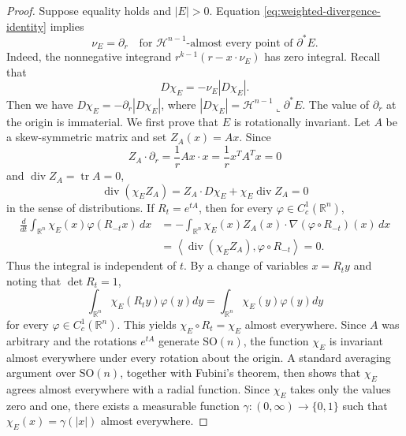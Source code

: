 \documentclass[11pt,reqno]{amsart}
\numberwithin{equation}{section}
\theoremstyle{definition}
\newcommand{\R}{\mathbb R}
\newcommand{\calH}{\mathcal H}
\newcommand{\diver}{\operatorname{div}}
\begin{document}
\begin{proof}
Suppose equality holds and $|E|>0$.  Equation \eqref{eq:weighted-divergence-identity} implies
\begin{equation*}
    \nu_E=\partial_r
    \quad\text{for }\calH^{n-1}\text{-almost every point of }\partial^*E.
\end{equation*}
Indeed, the nonnegative integrand $r^{k-1}(r-x\cdot\nu_E)$ has zero integral. Recall that
\begin{equation*}
    D\chi_E=-\nu_E|D\chi_E|.
\end{equation*}
Then we have $D\chi_E=-\partial_r|D\chi_E|$, where $|D\chi_E|=\mathcal{H}^{n-1}\mathbin{\llcorner}\partial^*E$.  The value of $\partial_r$ at the origin is immaterial. We first prove that $E$ is rotationally invariant. Let $A$ be a skew-symmetric matrix and set $Z_A(x)=Ax$.  Since 
\begin{equation*}
    Z_A\cdot \partial_r=\frac{1}{r}Ax\cdot x=\frac{1}{r}x^TA^Tx=0
\end{equation*}
and $\diver Z_A=\operatorname{tr}A=0$,
\begin{equation*}
    \diver(\chi_E Z_A)
    =Z_A\cdot D\chi_E+\chi_E\diver Z_A=0
\end{equation*}
in the sense of distributions. If $R_t=e^{tA}$, then for every $\varphi\in C_c^1(\R^n)$,
\begin{align*}
\frac{d}{dt}\int_{\mathbb R^n}
 \chi_E(x)\varphi(R_{-t}x)\,dx
&=-\int_{\mathbb R^n}
 \chi_E(x)Z_A(x)\cdot
 \nabla(\varphi\circ R_{-t})(x)\,dx\\
&=\left\langle
 \diver(\chi_EZ_A),\varphi\circ R_{-t}
 \right\rangle=0.
\end{align*}
Thus the integral is independent of $t$. By a change of variables $x=R_ty$ and noting that $\det R_t=1$, 
\begin{equation*}
    \int_{\R^n}\chi_E(R_ty)\varphi(y)dy=\int_{\R^n}\chi_E(y)\varphi(y)dy
\end{equation*}
for every $\varphi\in C_c^1(\R^n)$. This yields $\chi_E\circ R_t=\chi_E$ almost everywhere. Since $A$ was arbitrary and the rotations $e^{tA}$ generate $\mathrm{SO}(n)$, the function $\chi_E$ is invariant almost everywhere under every rotation about the origin. A standard averaging argument
over $\mathrm{SO}(n)$, together with Fubini's theorem, then shows that $\chi_E$ agrees almost everywhere with a radial function. Since $\chi_E$ takes only the values zero and one, there exists a measurable function $\gamma:(0,\infty)\to\{0,1\}$ such that $\chi_E(x)=\gamma(|x|)$ almost everywhere.


\end{proof}
\end{document}
